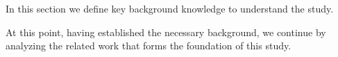 In this section we define key background knowledge to understand the study.





% 

% 

% 


At this point, having established the necessary background, we continue by analyzing the related work that forms the foundation of this study.